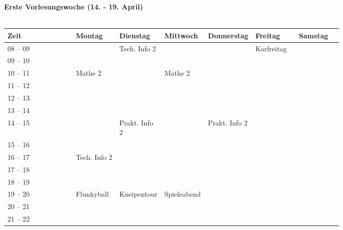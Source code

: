 \setlength{\arrayrulewidth}{0.3mm}  %

\textbf{Erste Vorlesungswoche (14. - 19. April)}\\
\\
\begin{tabular}{|l|p{0.13\linewidth}|p{0.13\linewidth}|p{0.13\linewidth}|p{0.13\linewidth}|p{0.13\linewidth}|p{0.13\linewidth}|} \hline
 Zeit & Montag & Dienstag & Mittwoch & Donnerstag & Freitag & Samstag \\ 
 \hline \hline 
 08 -- 09 & & \footnotesize{Tech. Info 2} & & & \cellcolor{lightlightgray}\footnotesize{Karfreitag} &\\ \cline{1-1}
 09 -- 10 &  & & & & \cellcolor{lightlightgray} &  \\ \cline{1-4} 
 10 -- 11 & \footnotesize{Mathe 2} & &  \footnotesize{Mathe 2} & & \cellcolor{lightlightgray} & \\ \cline{1-1}
 11 -- 12 & & & & & \cellcolor{lightlightgray} & \\ \cline{1-1} \cline{2-2} \cline{4-4}
 12 -- 13 & & & & & \cellcolor{lightlightgray} & \\ \cline{1-1} 
 13 -- 14 & & & & & \cellcolor{lightlightgray} & \\ \cline{1-1} \cline{3-3} \cline{5-5}
 14 -- 15 & &\footnotesize{Prakt. Info 2} & &\footnotesize{Prakt. Info 2} & \cellcolor{lightlightgray} & \\ \cline{1-1}
 15 -- 16 & & & & & \cellcolor{lightlightgray} & \\ \cline {1-3} \cline{5-5}
 16 -- 17 & \footnotesize{Tech. Info 2} & & & & \cellcolor{lightlightgray} & \\ \cline{1-1}
 17 -- 18 & & & & & \cellcolor{lightlightgray} & \\ \cline{1-1}
 18 -- 19 & & & & & \cellcolor{lightlightgray} &  \\ \cline{1-4} 
 19 -- 20 &  \cellcolor{lightlightgray} \footnotesize{Flunkyball} &  \cellcolor{lightlightgray} \footnotesize{Kneipentour} & \cellcolor{lightlightgray} \footnotesize{Spieleabend} & & \cellcolor{lightlightgray} & \\ \cline{1-1}
 20 -- 21 &  \cellcolor{lightlightgray} &  \cellcolor{lightlightgray} &  \cellcolor{lightlightgray} & & \cellcolor{lightlightgray} & \\ \cline{1-1}
 21 -- 22 &  \cellcolor{lightlightgray} &  \cellcolor{lightlightgray} &  \cellcolor{lightlightgray} & & \cellcolor{lightlightgray}& \\ \hline
\end{tabular}
\\

